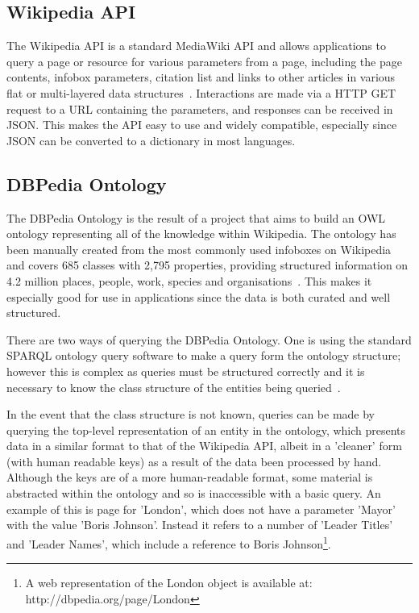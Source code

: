 \documentclass[authoryearcitations]{UoYCSproject}
\begin{document}
\subsection{Wikipedia API}
The Wikipedia API is a standard MediaWiki API and allows applications to query a page or resource for various parameters from a page, including the page contents, infobox parameters, citation list and links to other articles in various flat or multi-layered data structures~\cite{mediaWikiAPI}.  Interactions are made via a HTTP GET request to a URL containing the parameters, and responses can be received in JSON.  This makes the API easy to use and widely compatible, especially since JSON can be converted to a dictionary in most languages.

\subsection{DBPedia Ontology}
The DBPedia Ontology is the result of a project that aims to build an OWL ontology representing all of the knowledge within Wikipedia.  The ontology has been manually created from the most commonly used infoboxes on Wikipedia and covers 685 classes with 2,795 properties, providing structured information on 4.2 million places, people, work, species and organisations~\cite{dbPediaIntro}.  This makes it especially good for use in applications since the data is both curated and well structured.

There are two ways of querying the DBPedia Ontology.  One is using the standard SPARQL ontology query software to make a query form the ontology structure; however this is complex as queries must be structured correctly and it is necessary to know the class structure of the entities being queried~\cite{dbPediaSparql}.

In the event that the class structure is not known, queries can be made by querying the top-level representation of an entity in the ontology, which presents data in a similar format to that of the Wikipedia API, albeit in a 'cleaner' form (with human readable keys) as a result of the data been processed by hand.  Although the keys are of a more human-readable format, some material is abstracted within the ontology and so is inaccessible with a basic query.  An example of this is page for 'London', which does not have a parameter 'Mayor' with the value 'Boris Johnson'.  Instead it refers to a number of 'Leader Titles' and 'Leader Names', which include a reference to Boris Johnson\footnote{A web representation of the London object is available at: http://dbpedia.org/page/London}.
\end{document}
